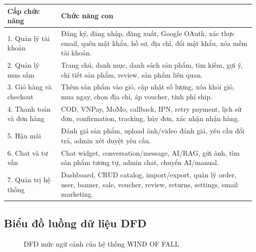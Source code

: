 \documentclass[12pt,a4paper]{report}
\begin{document}
\begin{longtable}{|p{4.1cm}|p{10.7cm}|}
\hline
\textbf{Cấp chức năng} & \textbf{Chức năng con} \\
\hline
1. Quản lý tài khoản & Đăng ký, đăng nhập, đăng xuất, Google OAuth, xác thực email, quên mật khẩu, hồ sơ, địa chỉ, đổi mật khẩu, xóa mềm tài khoản. \\
\hline
2. Quản lý mua sắm & Trang chủ, danh mục, danh sách sản phẩm, tìm kiếm, gợi ý, chi tiết sản phẩm, review, sản phẩm liên quan. \\
\hline
3. Giỏ hàng và checkout & Thêm sản phẩm vào giỏ, cập nhật số lượng, xóa khỏi giỏ, mua ngay, chọn địa chỉ, áp voucher, tính phí ship. \\
\hline
4. Thanh toán và đơn hàng & COD, VNPay, MoMo, callback, IPN, retry payment, lịch sử đơn, confirmation, tracking, hủy đơn, xác nhận nhận hàng. \\
\hline
5. Hậu mãi & Đánh giá sản phẩm, upload ảnh/video đánh giá, yêu cầu đổi trả, admin xét duyệt yêu cầu. \\
\hline
6. Chat và tư vấn & Chat widget, conversation/message, AI/RAG, gửi ảnh, tìm sản phẩm tương tự, admin chat, chuyển AI/manual. \\
\hline
7. Quản trị hệ thống & Dashboard, CRUD catalog, import/export, quản lý order, user, banner, sale, voucher, review, returns, settings, email marketing. \\
\hline
\end{longtable}

\subsection{Biểu đồ luồng dữ liệu DFD}

\begin{figure}[H]
    \centering
    \caption{DFD mức ngữ cảnh của hệ thống WIND OF FALL}
    \label{fig:dfd-context}
\end{figure}
\end{document}
